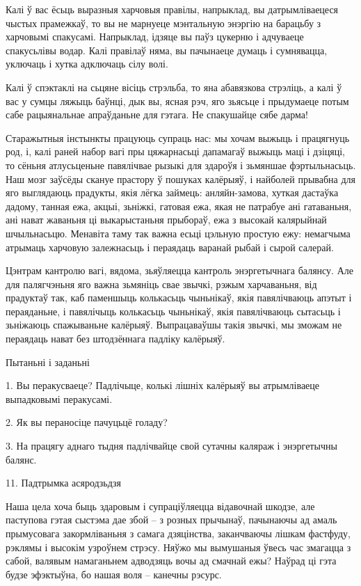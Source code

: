 Калі ў вас ёсьць выразныя харчовыя правілы, напрыклад, вы датрымліваецеся чыстых прамежкаў, то вы не марнуеце мэнтальную энэргію на барацьбу з харчовымі спакусамі. Напрыклад, ідзяце вы паўз цукерню і адчуваеце спакусьлівы водар. Калі правілаў няма, вы пачынаеце думаць і сумнявацца, уключаць і хутка адключаць сілу волі.

Калі ў спэктаклі на сьцяне вісіць стрэльба, то яна абавязкова стрэліць, а калі ў вас у сумцы ляжыць баўнці, дык вы, ясная рэч, яго зьясьце і прыдумаеце потым сабе рацыянальнае апраўданьне для гэтага. Не спакушайце сябе дарма!

Старажытныя інстынкты працуюць супраць нас: мы хочам выжыць і працягнуць род, і, калі раней набор вагі пры цяжарнасьці дапамагаў выжыць маці і дзіцяці, то сёньня атлусьценьне павялічвае рызыкі для здароўя і зьмяншае фэртыльнасьць. Наш мозг заўсёды скануе прастору ў пошуках калёрыяў, і найболей прывабна для яго выглядаюць прадукты, якія лёгка займець: анляйн-замова, хуткая дастаўка дадому, танная ежа, акцыі, зьніжкі, гатовая ежа, якая не патрабуе ані гатаваньня, ані нават жаваньня ці выкарыстаньня прыбораў, ежа з высокай калярыйнай шчыльнасьцю. Менавіта таму так важна есьці цэльную простую ежу: немагчыма атрымаць харчовую залежнасьць і пераядаць варанай рыбай і сырой салерай.

Цэнтрам кантролю вагі, вядома, зьяўляецца кантроль энэргетычнага балянсу. Але для палягчэньня яго важна зьмяніць свае звычкі, рэжым харчаваньня, від прадуктаў так, каб паменшыць колькасьць чыньнікаў, якія павялічваюць апэтыт і пераяданьне, і павялічыць колькасьць чыньнікаў, якія павялічваюць сытасьць і зьніжаюць спажываньне калёрыяў. Выпрацаваўшы такія звычкі, мы зможам не пераядаць нават без штодзённага падліку калёрыяў.

Пытаньні і заданьні

1. Вы перакусваеце? Падлічыце, колькі лішніх калёрыяў вы атрымліваеце выпадковымі перакусамі.

2. Як вы пераносіце пачуцьцё голаду?

3. На працягу аднаго тыдня падлічвайце свой сутачны каляраж і энэргетычны балянс.


11. Падтрымка асяродзьдзя

Наша цела хоча быць здаровым і супраціўляецца відавочнай шкодзе, але паступова гэтая сыстэма дае збой – з розных прычынаў, пачынаючы ад амаль прымусовага закормліваньня з самага дзяцінства, заканчваючы лішкам фастфуду, рэклямы і высокім узроўнем стрэсу. Няўжо мы вымушаныя ўвесь час змагацца з сабой, валявым намаганьнем адводзяць вочы ад смачнай ежы? Наўрад ці гэта будзе эфэктыўна, бо нашая воля – канечны рэсурс.

